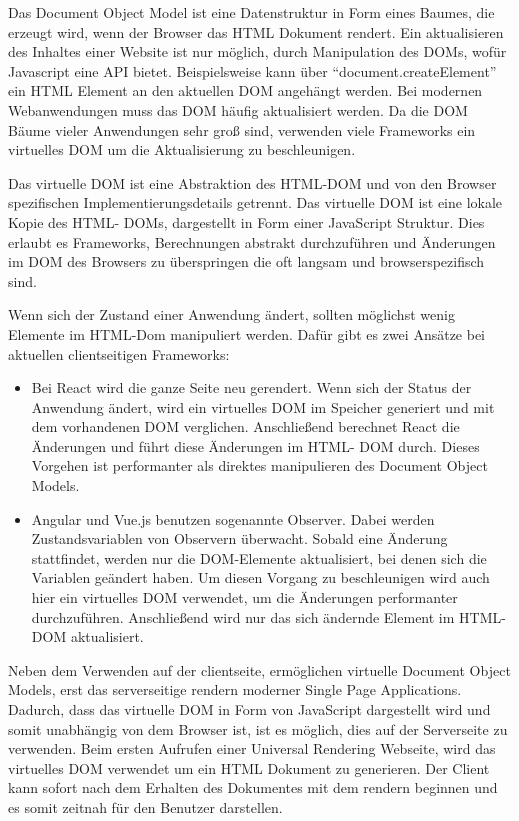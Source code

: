 \documentclass[runningheads]{llncs}
\begin{document}
Das Document Object Model ist eine Datenstruktur in Form eines Baumes, 
die erzeugt wird, wenn der Browser das HTML Dokument rendert. 
Ein aktualisieren des Inhaltes einer Website ist nur möglich, 
durch Manipulation des DOMs, wofür Javascript eine API bietet. 
Beispielsweise kann über “document.createElement” ein HTML Element 
an den aktuellen DOM angehängt werden. 
Bei modernen Webanwendungen muss das DOM häufig aktualisiert werden. 
Da die DOM Bäume vieler Anwendungen sehr groß sind, 
verwenden viele Frameworks ein virtuelles DOM um die 
Aktualisierung zu beschleunigen. 

Das virtuelle DOM ist eine Abstraktion des HTML-DOM und 
von den Browser spezifischen Implementierungsdetails getrennt. 
Das virtuelle DOM ist eine lokale Kopie des HTML- DOMs, 
dargestellt in Form einer JavaScript Struktur. 
Dies erlaubt es Frameworks, 
Berechnungen abstrakt durchzuführen und Änderungen im DOM des Browsers 
zu überspringen die oft langsam und browserspezifisch sind.

Wenn sich der Zustand einer Anwendung ändert, 
sollten möglichst wenig Elemente im HTML-Dom manipuliert werden. 
Dafür gibt es zwei Ansätze bei aktuellen clientseitigen Frameworks:

\begin{itemize}
  \item Bei React wird die ganze Seite neu gerendert. 
  Wenn sich der Status der Anwendung ändert, 
  wird ein virtuelles DOM im Speicher generiert 
  und mit dem vorhandenen DOM verglichen. 
  Anschließend berechnet React die Änderungen und führt diese 
  Änderungen im HTML- DOM durch. 
  Dieses Vorgehen ist performanter als direktes manipulieren 
  des Document Object Models.

  \item Angular und Vue.js benutzen sogenannte Observer. 
  Dabei werden  Zustandsvariablen von Observern überwacht. 
  Sobald eine Änderung stattfindet, 
  werden nur die DOM-Elemente aktualisiert, 
  bei denen sich die Variablen geändert haben. 
  Um diesen Vorgang zu beschleunigen 
  wird auch hier ein virtuelles DOM verwendet, 
  um die Änderungen performanter durchzuführen. 
  Anschließend wird nur das sich ändernde Element im HTML- DOM aktualisiert.
\end{itemize}
Neben dem Verwenden auf der clientseite, 
ermöglichen virtuelle Document Object Models, 
erst das serverseitige rendern moderner Single Page Applications. 
Dadurch, dass das virtuelle DOM in Form von JavaScript dargestellt wird und 
somit unabhängig von dem Browser ist, 
ist es möglich, dies auf der Serverseite zu verwenden. 
Beim ersten Aufrufen einer Universal Rendering Webseite, 
wird das virtuelles DOM verwendet um ein HTML Dokument zu generieren. 
Der Client kann sofort nach dem Erhalten des Dokumentes mit dem rendern beginnen und 
es somit zeitnah für den Benutzer darstellen.
\end{document}
